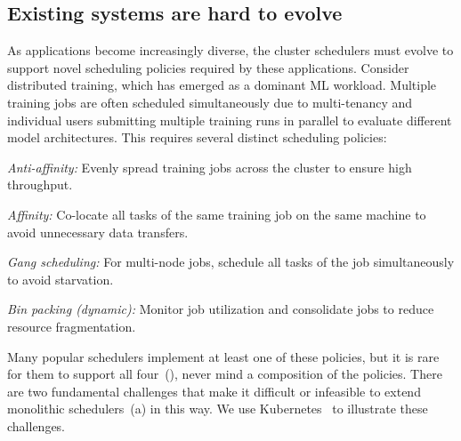 

\subsection{Existing systems are hard to evolve}
\label{sec:escher_motivation:example}

As applications become increasingly diverse, the cluster schedulers must evolve to support novel scheduling policies required by these applications. Consider distributed training, which has emerged as a dominant ML workload. 
Multiple training jobs are often scheduled simultaneously due to multi-tenancy and individual users submitting multiple training runs in parallel to evaluate different model architectures.
This requires several distinct scheduling policies: %
\begin{compactitem}
\item \emph{Anti-affinity:} Evenly spread training jobs across the cluster to ensure high throughput.
\item \emph{Affinity:} Co-locate all tasks of the same training job on the same machine to avoid unnecessary data transfers.
\item \emph{Gang scheduling:} For multi-node jobs, schedule all tasks of the job simultaneously to avoid starvation.
\item \emph{Bin packing (dynamic):} Monitor job utilization and consolidate jobs to reduce resource fragmentation. %
\end{compactitem}

Many popular schedulers implement at least one of these policies, but it is rare for them to support all four~(), never mind a composition of the policies.
There are two fundamental challenges that make it difficult or infeasible to extend monolithic schedulers~(a) in this way.
We use Kubernetes~\cite{kubernetes} to illustrate these challenges. %
% 

